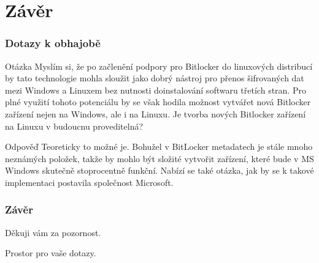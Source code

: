 \documentclass{beamer}
\begin{document}

\section{Závěr}

\begin{frame}
  \frametitle{Dotazy k obhajobě}
	\begin{block}{Otázka}
		Myslím si, že po začlenění podpory pro Bitlocker do linuxových distribucí by tato technologie
mohla sloužit jako dobrý nástroj pro přenos šifrovaných dat mezi Windows a Linuxem bez nutnosti doinstalování softwaru třetích stran. Pro plné využití tohoto potenciálu by se však hodila možnost vytvářet nová Bitlocker zařízení nejen na Windows, ale i na Linuxu. Je tvorba nových Bitlocker zařízení na Linuxu v budoucnu proveditelná?
	\end{block}
	
		\begin{block}{Odpověď}
		Teoreticky to možné je. Bohužel v BitLocker metadatech je stále mnoho neznámých položek, takže by mohlo být složité vytvořit zařízení, které bude v MS Windows skutečně stoprocentně funkční. Nabízí se také otázka, jak by se k takové implementaci postavila společnost Microsoft.
	\end{block}

\end{frame}

\begin{frame}
	\frametitle{Závěr}

	\begin{center}
	Děkuji vám za pozornost.
	\end{center}

\vspace{0.5cm}

	\begin{center}
	Prostor pro vaše dotazy.
	\end{center}
\end{frame}
\end{document}
